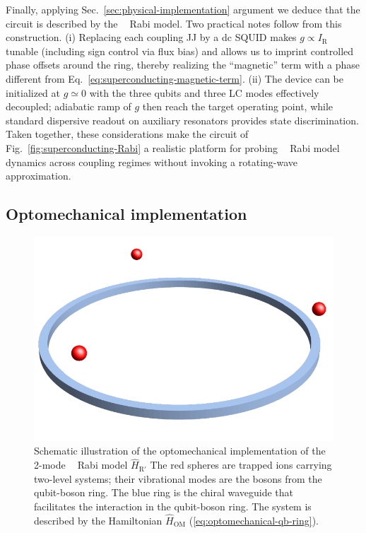 \documentclass[reprint, aps, prx, amsmath, amssymb, longbibliography, superscriptaddress]{revtex4-2}
\DeclareMathOperator{\Zthree}{\mathbb{Z}_3}
\begin{document}
Finally, applying Sec.~\ref{sec:physical-implementation} argument we deduce that the circuit is described by the $\Zthree$ Rabi model. Two practical notes follow from this construction. (i) Replacing each coupling JJ by a dc SQUID makes $g \propto I_{\mathrm{R}}$ tunable (including sign control via flux bias) and allows us to imprint controlled phase offsets around the ring, thereby realizing the ``magnetic'' term with a phase different from Eq.~\eqref{eq:superconducting-magnetic-term}. (ii) The device can be initialized at $g\simeq 0$ with the three qubits and three LC modes effectively decoupled; adiabatic ramp of $g$ then reach the target operating point, while standard dispersive readout on auxiliary resonators provides state discrimination. Taken together, these considerations make the circuit of Fig.~\ref{fig:superconducting-Rabi} a realistic platform for probing $\Zthree$ Rabi model dynamics across coupling regimes without invoking a rotating-wave approximation.


\subsection{Optomechanical implementation}
\label{sec:optomechanical-implementation}

\begin{figure}
    \includegraphics[width=0.8\linewidth]{pics/optomechanical_Rabi_pic.pdf}
    \caption{Schematic illustration of the optomechanical implementation of the 2-mode $\Zthree$ Rabi model $\hat H_{\text{R}'}$ \cite{sedov_chiral_2020} The red spheres are trapped ions carrying two-level systems; their vibrational modes are the bosons from the qubit-boson ring. The blue ring is the chiral waveguide that facilitates the interaction in the qubit-boson ring. The system is described by the Hamiltonian $\hat H_{\text{OM}}$ (\ref{eq:optomechanical-qb-ring}).}
    \label{fig:optomechanical-rabi}
\end{figure}
\end{document}
